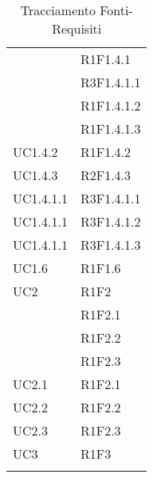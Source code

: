 \begin{longtable}{|>{\centering}m{5cm}|m{5cm}<{\centering}|}
{UC1.4.1}&{R1F1.4.1}\\
&{R3F1.4.1.1}\\
&{R1F1.4.1.2}\\
&{R1F1.4.1.3}\\ \hline
{UC1.4.2}&{R1F1.4.2}\\ \hline
{UC1.4.3}&{R2F1.4.3}\\ \hline
{UC1.4.1.1}&{R3F1.4.1.1}\\ \hline
{UC1.4.1.1}&{R3F1.4.1.2}\\ \hline
{UC1.4.1.1}&{R3F1.4.1.3}\\ \hline
{UC1.6}&{R1F1.6}\\ \hline


{UC2}&{R1F2}\\
&{R1F2.1}\\
&{R1F2.2}\\
&{R1F2.3}\\ \hline
{UC2.1}&{R1F2.1}\\ \hline
{UC2.2}&{R1F2.2}\\ \hline
{UC2.3}&{R1F2.3}\\ \hline

{UC3}&{R1F3}\\ \hline

\caption[Tracciamento Fonti-Requisiti]{Tracciamento Fonti-Requisiti}
\label{tabella: Tracciamento Fonti-Requisiti}
\end{longtable}



